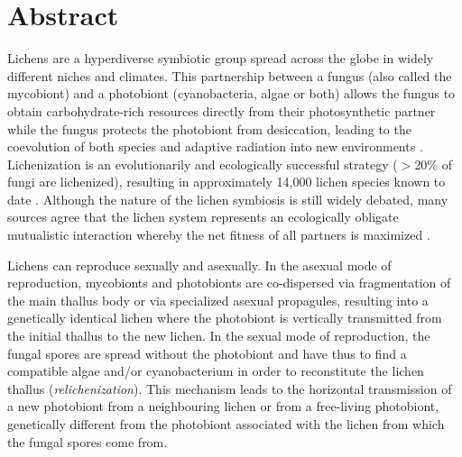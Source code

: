 \documentclass[runningheads,a4paper]{llncs}
\begin{document}
\section*{Abstract}
Lichens are a hyperdiverse symbiotic group spread across the globe in widely different niches and climates. This partnership between a fungus (also called the mycobiont) and a photobiont (cyanobacteria, algae or both) allows the fungus to obtain carbohydrate-rich resources directly from their photosynthetic partner \cite{lutzoni2009lichens} while the fungus protects the photobiont from desiccation, leading to the coevolution of both species and adaptive radiation into new environments \cite{nash1996lichen}. Lichenization is an evolutionarily and ecologically successful strategy ($>$20\% of fungi are lichenized), resulting in approximately 14,000 lichen species known to date \cite{lutzoni2009lichens,honegger1998lichen}. Although the nature of the lichen symbiosis is still widely debated, many sources agree that the lichen system represents an ecologically obligate mutualistic interaction whereby the net fitness of all partners is maximized \cite{bronstein1994our,honegger1998lichen}.


Lichens can reproduce sexually and asexually. In the asexual mode of reproduction, mycobionts and photobionts are co-dispersed via fragmentation of the main thallus body or via specialized asexual propagules, resulting into a genetically identical lichen where the photobiont is vertically transmitted from the initial thallus to the new lichen. 
In the sexual mode of reproduction, the fungal spores are spread without the photobiont and have thus to find a compatible algae and/or cyanobacterium in order to reconstitute the lichen thallus (\emph{relichenization}). This mechanism leads to the horizontal transmission of a new photobiont from a neighbouring lichen or from a free-living photobiont, genetically different from the photobiont associated with the lichen from which the fungal spores come from. 
\end{document}
